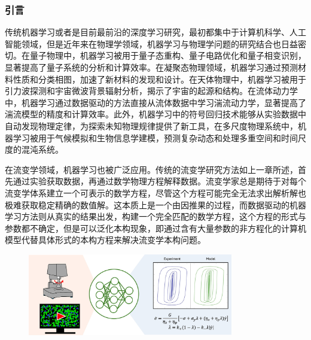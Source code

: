 \subsubsection{引言}
传统机器学习或者是目前最前沿的深度学习研究，最初都集中于计算机科学、人工智能领域，但是近年来在物理学领域，机器学习与物理学问题的研究结合也日益密切\cite{choudhary2022recent}。在量子物理中，机器学习被用于量子态重构、量子电路优化和量子相变识别，显著提高了量子系统的分析和计算效率\cite{biamonte2017quantum}。在凝聚态物理领域，机器学习通过预测材料性质和分类相图，加速了新材料的发现和设计\cite{choudhary2022recent}。在天体物理中，机器学习被用于引力波探测和宇宙微波背景辐射分析，揭示了宇宙的起源和结构\cite{bufano2023machine}。在流体动力学中，机器学习通过数据驱动的方法直接从流体数据中学习湍流动力学，显著提高了湍流模型的精度和计算效率\cite{bruntonMachineLearningFluid2020}。此外，机器学习中的符号回归技术能够从实验数据中自动发现物理定律，为探索未知物理规律提供了新工具\cite{udrescuAIFeynmanPhysicsinspired2020}，在多尺度物理系统中，机器学习被用于气候模拟和生物信息学建模，预测复杂动态和处理多重空间和时间尺度的混沌系统。

在流变学领域，机器学习也被广泛应用。传统的流变学研究方法如上一章所述，首先通过实验获取数据，再通过数学物理方程解释数据。流变学家总是期待于对每个流变学体系建立一个可表示的数学方程，尽管这个方程可能完全无法求出解析解也极难获取稳定精确的数值解。这本质上是一个由因推果的过程，而数据驱动的机器学习方法则从真实的结果出发，构建一个完全匹配的数学方程，这个方程的形式与参数都不确定，但是可以泛化本构现象，即通过含有大量参数的非方程化的计算机模型代替具体形式的本构方程来解决流变学本构问题\cite{colenMachineLearningActivenematic2021,bahiuddinReviewModelingSchemes2024,mangalDatadrivenTechniquesRheology2025}。
\begin{figure}[htbp]
  \centering
  \includegraphics[width=0.8\textwidth]{Fig/datadrivenintro.jpg}
\end{figure}

